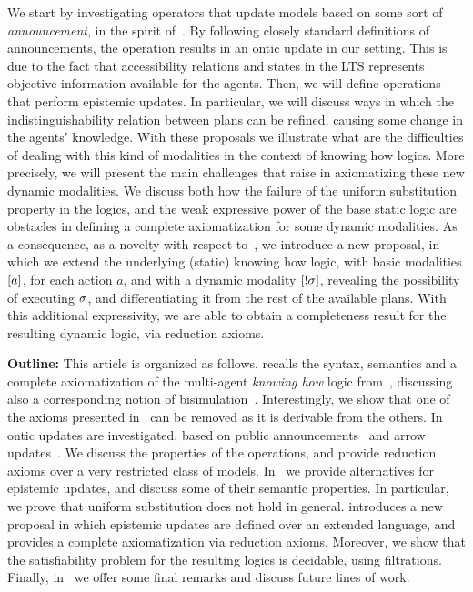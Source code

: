 We start by investigating operators that update models based on some sort of \emph{announcement}, in the spirit of~\cite{Plaza89:lopc}. By following closely standard definitions of announcements, the operation results in an ontic update in our setting. This is due to the fact that accessibility relations and states in the LTS represents objective information available for the agents. Then, we will define operations that perform epistemic updates. In particular, we will discuss ways in which the indistinguishability relation between plans can be refined, causing some change in the agents' knowledge. With these proposals we illustrate what are the difficulties of dealing with this kind of modalities in the context of knowing how logics. More precisely, we will present the main challenges that raise in axiomatizing these new dynamic modalities. We discuss both how the failure of the uniform substitution property in the logics, and the weak expressive power of the base static logic are obstacles in defining a complete axiomatization for some dynamic modalities. As a consequence, as a novelty with respect to~\cite{AFSV22}, we introduce a new proposal, in which we extend the underlying (static) knowing how logic, with basic modalities $[a]$, for each action $a$, and with a dynamic modality $[!\sigma]$, revealing the possibility of executing $\sigma$, and differentiating it from the rest of the available plans. With this additional expressivity, we are able to obtain a completeness result for the resulting dynamic logic, via reduction axioms.
\medskip

\noindent
\textbf{Outline:} This article is organized as follows.  recalls the syntax, semantics and a complete axiomatization of the multi-agent \emph{knowing how} logic from~\cite{AFSVQ21}, discussing also a corresponding notion of bisimulation~\cite{AFSVQ23report}. Interestingly, we show that one of the axioms presented in~\cite{AFSVQ21,AFSVQ23report} can be removed as it is derivable from the others. In~ ontic updates are investigated, based on public announcements~\cite{Plaza89:lopc} and arrow updates~\cite{KooiR11}. We discuss the properties of the operations, and provide reduction axioms over a very restricted class of models. In~ we provide alternatives for epistemic updates, and discuss some of their semantic properties. In particular, we prove that uniform substitution does not hold in general.  introduces a new proposal in which epistemic updates are defined over an extended language, and provides a complete axiomatization via reduction axioms. Moreover, we show that the satisfiability problem for the resulting logics is decidable, using filtrations. Finally, in~ we offer some final remarks and discuss future lines of work.
